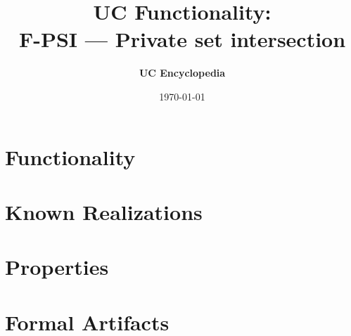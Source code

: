 \documentclass[11pt,a4paper]{article}
\title{\textbf{\Large UC Functionality:}\\[0.2em] \Large F-PSI --- Private set intersection}
\author{\textbf{UC Encyclopedia}}
\date{\today}
\newtheorem{functionality}{Functionality}
\begin{document}
\maketitle

\begin{abstract}
\end{abstract}

\section{Functionality}

%

\section{Known Realizations}


\section{Properties}


\section{Formal Artifacts}

\end{document}
